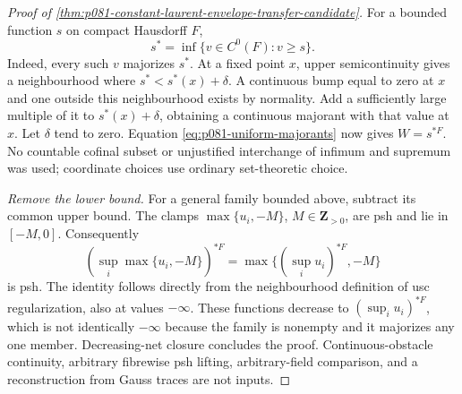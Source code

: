\begin{proof}[Proof of \cref{thm:p081-constant-laurent-envelope-transfer-candidate}]
For a bounded function \(s\) on compact Hausdorff \(F\),
\begin{equation}\label{eq:p081-uniform-majorants}
 s^*=\inf\{v\in C^0(F):v\geq s\}.
\end{equation}
Indeed, every such \(v\) majorizes \(s^*\). At a fixed point \(x\),
upper semicontinuity gives a neighbourhood where
\(s^*<s^*(x)+\delta\). A continuous bump equal to zero at \(x\) and
one outside this neighbourhood exists by normality. Add a sufficiently
large multiple of it to \(s^*(x)+\delta\), obtaining a continuous
majorant with that value at \(x\). Let \(\delta\) tend to zero.
Equation \eqref{eq:p081-uniform-majorants} now gives \(W=s^{*F}\).
No countable cofinal subset or unjustified interchange of infimum and
supremum was used; coordinate choices use ordinary set-theoretic choice.

\emph{Remove the lower bound.}
For a general family bounded above, subtract its common upper bound.
The clamps \(\max\{u_i,-M\}\), \(M\in\mathbf Z_{>0}\), are psh
and lie in \([-M,0]\). Consequently
\[
 (\sup_i\max\{u_i,-M\})^{*F}
   =\max\{(\sup_i u_i)^{*F},-M\}
\]
is psh. The identity follows directly from the neighbourhood definition
of usc regularization, also at values \(-\infty\). These functions
decrease to \((\sup_i u_i)^{*F}\), which is not identically
\(-\infty\) because the family is nonempty and it majorizes any one
member. Decreasing-net closure concludes the proof. Continuous-obstacle
continuity, arbitrary fibrewise psh lifting, arbitrary-field comparison,
and a reconstruction from Gauss traces are not inputs.
\end{proof}
